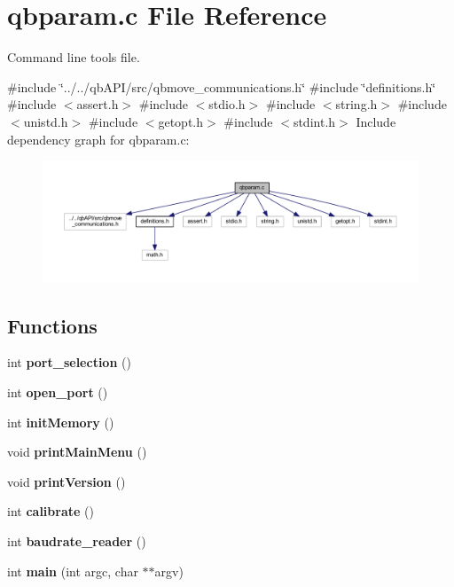 \section{qbparam.\+c File Reference}
\label{qbparam_8c}


Command line tools file.  


{\ttfamily \#include \char`\"{}../../qb\+A\+P\+I/src/qbmove\+\_\+communications.\+h\char`\"{}}\newline
{\ttfamily \#include \char`\"{}definitions.\+h\char`\"{}}\newline
{\ttfamily \#include $<$assert.\+h$>$}\newline
{\ttfamily \#include $<$stdio.\+h$>$}\newline
{\ttfamily \#include $<$string.\+h$>$}\newline
{\ttfamily \#include $<$unistd.\+h$>$}\newline
{\ttfamily \#include $<$getopt.\+h$>$}\newline
{\ttfamily \#include $<$stdint.\+h$>$}\newline
Include dependency graph for qbparam.\+c\+:\nopagebreak
\begin{figure}[H]
\begin{center}
\leavevmode
\includegraphics[width=350pt]{qbparam_8c__incl}
\end{center}
\end{figure}
\subsection*{Functions}
\begin{DoxyCompactItemize}
\item 
\mbox{\label{qbparam_8c_a3939d4ef4a0e2be02b1eb9e1994ec985}} 
int {\bfseries port\+\_\+selection} ()
\item 
\mbox{\label{qbparam_8c_abe553924eef0ba8079dc745caf1f348c}} 
int {\bfseries open\+\_\+port} ()
\item 
\mbox{\label{qbparam_8c_a564e2594b1cf22357d72b2e2cf7fdaf3}} 
int {\bfseries init\+Memory} ()
\item 
\mbox{\label{qbparam_8c_af9dce1973196a5934ee5ec20ea417324}} 
void {\bfseries print\+Main\+Menu} ()
\item 
\mbox{\label{qbparam_8c_a9c4b081f1e1ad60def15811c71a936f2}} 
void {\bfseries print\+Version} ()
\item 
\mbox{\label{qbparam_8c_aa78cef14864eb28be4f47d1ebf0e29f1}} 
int {\bfseries calibrate} ()
\item 
int \textbf{ baudrate\+\_\+reader} ()
\item 
\mbox{\label{qbparam_8c_a3c04138a5bfe5d72780bb7e82a18e627}} 
int {\bfseries main} (int argc, char $\ast$$\ast$argv)
\end{DoxyCompactItemize}
